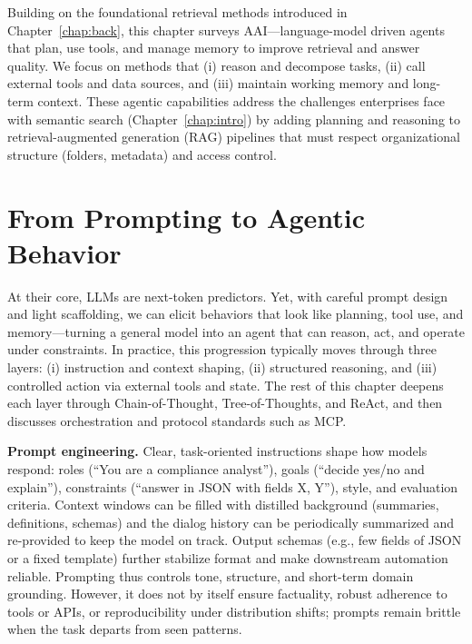 \label{chap:stateofart}
\cleardoublepage

Building on the foundational retrieval methods introduced in Chapter~\ref{chap:back}, this chapter surveys \gls{AAI}—language-model driven agents that plan, use tools, and manage memory to improve retrieval and answer quality. We focus on methods that (i) reason and decompose tasks, (ii) call external tools and data sources, and (iii) maintain working memory and long-term context. These agentic capabilities address the challenges enterprises face with semantic search (Chapter~\ref{chap:intro}) by adding planning and reasoning to retrieval-augmented generation (\gls{RAG}) pipelines that must respect organizational structure (folders, metadata) and access control.

\section{From Prompting to Agentic Behavior}

At their core, \glspl{LLM} are next-token predictors. Yet, with careful prompt design and light scaffolding, we can elicit behaviors that look like planning, tool use, and memory—turning a general model into an agent that can reason, act, and operate under constraints. In practice, this progression typically moves through three layers: (i) instruction and context shaping, (ii) structured reasoning, and (iii) controlled action via external tools and state. The rest of this chapter deepens each layer through Chain-of-Thought, Tree-of-Thoughts, and ReAct, and then discusses orchestration and protocol standards such as MCP.

\textbf{Prompt engineering.} Clear, task-oriented instructions shape how models respond: roles (``You are a compliance analyst''), goals (``decide yes/no and explain''), constraints (``answer in JSON with fields X, Y''), style, and evaluation criteria. Context windows can be filled with distilled background (summaries, definitions, schemas) and the dialog history can be periodically summarized and re-provided to keep the model on track. Output schemas (e.g., few fields of JSON or a fixed template) further stabilize format and make downstream automation reliable. Prompting thus controls tone, structure, and short-term domain grounding. However, it does not by itself ensure factuality, robust adherence to tools or APIs, or reproducibility under distribution shifts; prompts remain brittle when the task departs from seen patterns.

